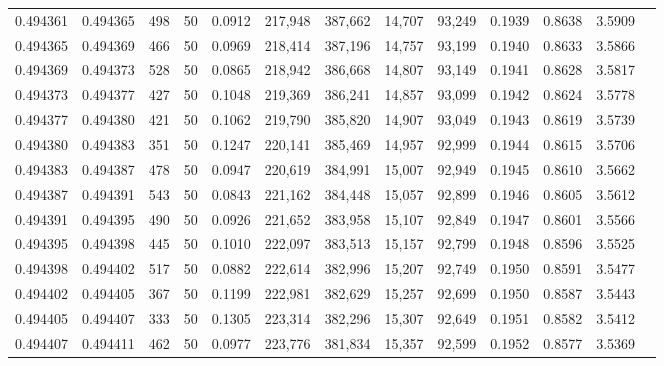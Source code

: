 \begin{tabular}{rrrrrrrrrrrrr}
0.494361 & 0.494365 &   498 &  50 &                                     0.0912 & 217,948 & 387,662 &  14,707 &  93,249 & 0.1939 & 0.8638 & 3.5909 \\
0.494365 & 0.494369 &   466 &  50 &                                     0.0969 & 218,414 & 387,196 &  14,757 &  93,199 & 0.1940 & 0.8633 & 3.5866 \\
0.494369 & 0.494373 &   528 &  50 &                                     0.0865 & 218,942 & 386,668 &  14,807 &  93,149 & 0.1941 & 0.8628 & 3.5817 \\
0.494373 & 0.494377 &   427 &  50 &                                     0.1048 & 219,369 & 386,241 &  14,857 &  93,099 & 0.1942 & 0.8624 & 3.5778 \\
0.494377 & 0.494380 &   421 &  50 &                                     0.1062 & 219,790 & 385,820 &  14,907 &  93,049 & 0.1943 & 0.8619 & 3.5739 \\
0.494380 & 0.494383 &   351 &  50 &                                     0.1247 & 220,141 & 385,469 &  14,957 &  92,999 & 0.1944 & 0.8615 & 3.5706 \\
0.494383 & 0.494387 &   478 &  50 &                                     0.0947 & 220,619 & 384,991 &  15,007 &  92,949 & 0.1945 & 0.8610 & 3.5662 \\
0.494387 & 0.494391 &   543 &  50 &                                     0.0843 & 221,162 & 384,448 &  15,057 &  92,899 & 0.1946 & 0.8605 & 3.5612 \\
0.494391 & 0.494395 &   490 &  50 &                                     0.0926 & 221,652 & 383,958 &  15,107 &  92,849 & 0.1947 & 0.8601 & 3.5566 \\
0.494395 & 0.494398 &   445 &  50 &                                     0.1010 & 222,097 & 383,513 &  15,157 &  92,799 & 0.1948 & 0.8596 & 3.5525 \\
0.494398 & 0.494402 &   517 &  50 &                                     0.0882 & 222,614 & 382,996 &  15,207 &  92,749 & 0.1950 & 0.8591 & 3.5477 \\
0.494402 & 0.494405 &   367 &  50 &                                     0.1199 & 222,981 & 382,629 &  15,257 &  92,699 & 0.1950 & 0.8587 & 3.5443 \\
0.494405 & 0.494407 &   333 &  50 &                                     0.1305 & 223,314 & 382,296 &  15,307 &  92,649 & 0.1951 & 0.8582 & 3.5412 \\
0.494407 & 0.494411 &   462 &  50 &                                     0.0977 & 223,776 & 381,834 &  15,357 &  92,599 & 0.1952 & 0.8577 & 3.5369 \\

\end{tabular}
